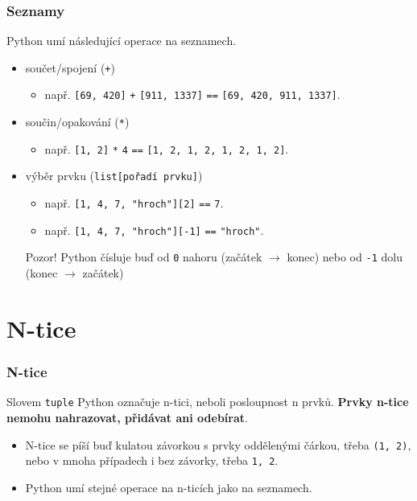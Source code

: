 \documentclass[aspectratio=169,11pt]{beamer}
\begin{document}
\begin{frame}
 \frametitle{Seznamy}
 Python umí následující operace na seznamech.
 \begin{itemize}
  \item<1-> součet/spojení (\texttt{+})
   \begin{itemize}
    \item např. \texttt{[69, 420]} \texttt{+} \texttt{[911, 1337]} \texttt{==}
     \texttt{[69, 420, 911, 1337]}.
   \end{itemize}
  \item<2-> součin/opakování (\texttt{*})
   \begin{itemize}
    \item např. \texttt{[1, 2]} \texttt{*} \texttt{4} \texttt{==} \texttt{[1, 2,
     1, 2, 1, 2, 1, 2]}.
   \end{itemize}
  \item<3-> výběr prvku (\texttt{list[pořadí prvku]})
   \begin{itemize}
    \item např. \texttt{[1, 4, 7, "hroch"][2]} \texttt{==} \texttt{7}.
    \item např. \texttt{[1, 4, 7, "hroch"][-1]} \texttt{==} \texttt{"hroch"}.
   \end{itemize}
   \alert{Pozor!} Python čísluje buď od \texttt{0} nahoru (začátek $\rightarrow$
   konec) nebo od \texttt{-1} dolu (konec $\rightarrow$ začátek)
 \end{itemize}
\end{frame}

\section[N-tice]{N-tice}

\begin{frame}[plain]
 \sectionpage
\end{frame}

\begin{frame}
 \frametitle{N-tice}
 \begin{tcolorbox}[title=Datový typ \texttt{tuple}]
  Slovem \texttt{\alert{tuple}} Python označuje n-tici, neboli posloupnost n
  prvků. \textbf{Prvky n-tice nemohu nahrazovat, přidávat ani odebírat}.
 \end{tcolorbox}
 \begin{itemize}
  \item<2-> N-tice se píší buď kulatou závorkou s prvky oddělenými čárkou, třeba
   \texttt{(1, 2)}, nebo v mnoha případech i bez závorky, třeba \texttt{1, 2}.
  \item<3-> Python umí stejné operace na n-ticích jako na seznamech.
 \end{itemize}
\end{frame}
\end{document}
